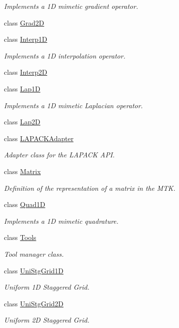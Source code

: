 \begin{DoxyCompactItemize}
\begin{DoxyCompactList}\small\item\em Implements a 1\+D mimetic gradient operator. \end{DoxyCompactList}\item 
class \hyperlink{classmtk_1_1Grad2D}{Grad2\+D}
\item 
class \hyperlink{classmtk_1_1Interp1D}{Interp1\+D}
\begin{DoxyCompactList}\small\item\em Implements a 1\+D interpolation operator. \end{DoxyCompactList}\item 
class \hyperlink{classmtk_1_1Interp2D}{Interp2\+D}
\item 
class \hyperlink{classmtk_1_1Lap1D}{Lap1\+D}
\begin{DoxyCompactList}\small\item\em Implements a 1\+D mimetic Laplacian operator. \end{DoxyCompactList}\item 
class \hyperlink{classmtk_1_1Lap2D}{Lap2\+D}
\item 
class \hyperlink{classmtk_1_1LAPACKAdapter}{L\+A\+P\+A\+C\+K\+Adapter}
\begin{DoxyCompactList}\small\item\em Adapter class for the L\+A\+P\+A\+C\+K A\+P\+I. \end{DoxyCompactList}\item 
class \hyperlink{classmtk_1_1Matrix}{Matrix}
\begin{DoxyCompactList}\small\item\em Definition of the representation of a matrix in the M\+T\+K. \end{DoxyCompactList}\item 
class \hyperlink{classmtk_1_1Quad1D}{Quad1\+D}
\begin{DoxyCompactList}\small\item\em Implements a 1\+D mimetic quadrature. \end{DoxyCompactList}\item 
class \hyperlink{classmtk_1_1Tools}{Tools}
\begin{DoxyCompactList}\small\item\em Tool manager class. \end{DoxyCompactList}\item 
class \hyperlink{classmtk_1_1UniStgGrid1D}{Uni\+Stg\+Grid1\+D}
\begin{DoxyCompactList}\small\item\em Uniform 1\+D Staggered Grid. \end{DoxyCompactList}\item 
class \hyperlink{classmtk_1_1UniStgGrid2D}{Uni\+Stg\+Grid2\+D}
\begin{DoxyCompactList}\small\item\em Uniform 2\+D Staggered Grid. \end{DoxyCompactList}\end{DoxyCompactItemize}
